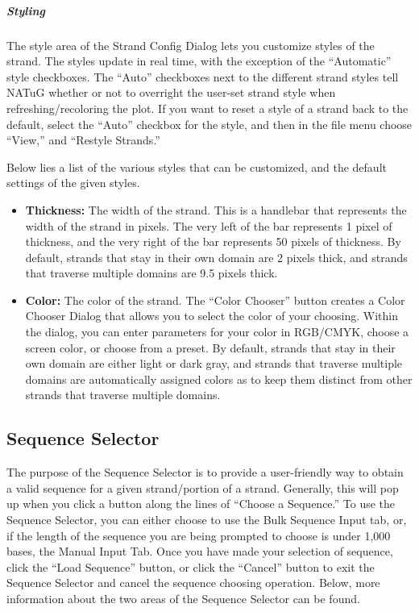 \documentclass[titlepage]{article}
\begin{document}
\subparagraph{Styling}
The style area of the Strand Config Dialog lets you customize styles of the strand. The styles update in real time, with the exception of the ``Automatic'' style checkboxes. The ``Auto'' checkboxes next to the different strand styles tell NATuG whether or not to overright the user-set strand style when refreshing/recoloring the plot. If you want to reset a style of a strand back to the default, select the ``Auto'' checkbox for the style, and then in the file menu choose ``View,'' and ``Restyle Strands.''

Below lies a list of the various styles that can be customized, and the default settings of the given styles.
\begin{itemize}
	\item \textbf{Thickness:} The width of the strand. This is a handlebar that represents the width of the strand in pixels. The very left of the bar represents 1 pixel of thickness, and the very right of the bar represents 50 pixels of thickness. By default, strands that stay in their own domain are 2 pixels thick, and strands that traverse multiple domains are 9.5 pixels thick.
	\item \textbf{Color:} The color of the strand. The ``Color Chooser'' button creates a Color Chooser Dialog that allows you to select the color of your choosing. Within the dialog, you can enter parameters for your color in RGB/CMYK, choose a screen color, or choose from a preset. By default, strands that stay in their own domain are either light or dark gray, and strands that traverse multiple domains are automatically assigned colors as to keep them distinct from other strands that traverse multiple domains.
\end{itemize}

\subsection{Sequence Selector} \label{sect:sequence-selector}
	The purpose of the Sequence Selector is to provide a user-friendly way to obtain a valid sequence for a given strand/portion of a strand. Generally, this will pop up when you click a button along the lines of ``Choose a Sequence.'' To use the Sequence Selector, you can either choose to use the Bulk Sequence Input tab, or, if the length of the sequence you are being prompted to choose is under 1,000 bases, the Manual Input Tab. Once you have made your selection of sequence, click the ``Load Sequence'' button, or click the ``Cancel'' button to exit the Sequence Selector and cancel the sequence choosing operation. Below, more information about the two areas of the Sequence Selector can be found.
\end{document}
